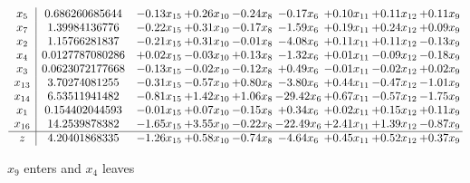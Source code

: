 \documentclass[9pt]{article}
\begin{document}
 \[\begin{array}{c| c c@{\hskip 2pt} c@{\hskip 2pt} c@{\hskip 2pt} c@{\hskip 2pt} c@{\hskip 2pt} c@{\hskip 2pt} c@{\hskip 2pt} }
 x_{5}   &  0.686260685644 & -0.13 x_{15} & +  0.26 x_{10} & -0.24 x_{8} & -0.17 x_{6} & +  0.10 x_{11} & +  0.11 x_{12} & +  0.11 x_{9}\\
 x_{7}   &  1.39984136776 & -0.22 x_{15} & +  0.31 x_{10} & -0.17 x_{8} & -1.59 x_{6} & +  0.19 x_{11} & +  0.24 x_{12} & +  0.09 x_{9}\\
 x_{2}   &  1.15766281837 & -0.21 x_{15} & +  0.31 x_{10} & -0.01 x_{8} & -4.08 x_{6} & +  0.11 x_{11} & +  0.11 x_{12} & -0.13 x_{9}\\
 x_{4}   &  0.0127787080286 & +  0.02 x_{15} & -0.03 x_{10} & +  0.13 x_{8} & -1.32 x_{6} & +  0.01 x_{11} & -0.09 x_{12} & -0.18 x_{9}\\
 x_{3}   &  0.0623072177668 & -0.13 x_{15} & -0.02 x_{10} & -0.12 x_{8} & +  0.49 x_{6} & -0.01 x_{11} & -0.02 x_{12} & +  0.02 x_{9}\\
 x_{13}   &  3.70274081255 & -0.31 x_{15} & -0.57 x_{10} & +  0.80 x_{8} & -3.80 x_{6} & +  0.44 x_{11} & -0.47 x_{12} & -1.01 x_{9}\\
 x_{14}   &  6.53511941482 & -0.81 x_{15} & +  1.42 x_{10} & +  1.06 x_{8} & -29.42 x_{6} & +  0.67 x_{11} & -0.57 x_{12} & -1.75 x_{9}\\
 x_{1}   &  0.154402044593 & -0.01 x_{15} & +  0.07 x_{10} & -0.15 x_{8} & +  0.34 x_{6} & +  0.02 x_{11} & +  0.15 x_{12} & +  0.11 x_{9}\\
 x_{16}   &  14.2539878382 & -1.65 x_{15} & +  3.55 x_{10} & -0.22 x_{8} & -22.49 x_{6} & +  2.41 x_{11} & +  1.39 x_{12} & -0.87 x_{9}\\
\hline
z    &  4.20401868335 & -1.26 x_{15} & +  0.58 x_{10} & -0.74 x_{8} & -4.64 x_{6} & +  0.45 x_{11} & +  0.52 x_{12} & +  0.37 x_{9}\\
\end{array}\]


 $ x_{9} $ enters and $ x_{4} $ leaves 
\end{document}

